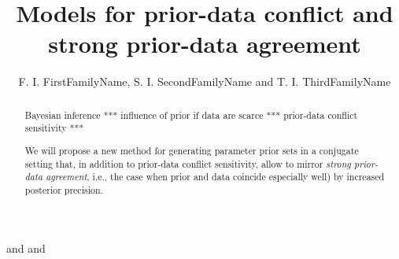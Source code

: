%
\renewcommand{\thefootnote}{\fnsymbol{footnote}}
\author{F. I. FirstFamilyName, S. I. SecondFamilyName and T. I. ThirdFamilyName}{
 \footnotemark[1]
and
  \footnotemark[2]
and
  \footnotemark[3]
}


\title{Models for prior-data conflict and strong prior-data agreement}

\maketitle

\renewcommand{\thefootnote}{\arabic{footnote}}

\begin{abstract}
Bayesian inference *** influence of prior if data are scarce *** prior-data conflict sensitivity ***

We will propose a new method for generating parameter prior sets in a conjugate setting
that, in addition to prior-data conflict sensitivity, allow to mirror \emph{strong prior-data agreement},
i.e., the case when prior and data coincide especially well) by increased posterior precision.

\end{abstract}



\def\pdc{prior-data conflict}

\newcommand{\reals}{\mathbb{R}}
\newcommand{\posreals}{\reals_{>0}}
\newcommand{\posrealszero}{\reals_{\ge 0}}
\newcommand{\naturals}{\mathbb{N}}

